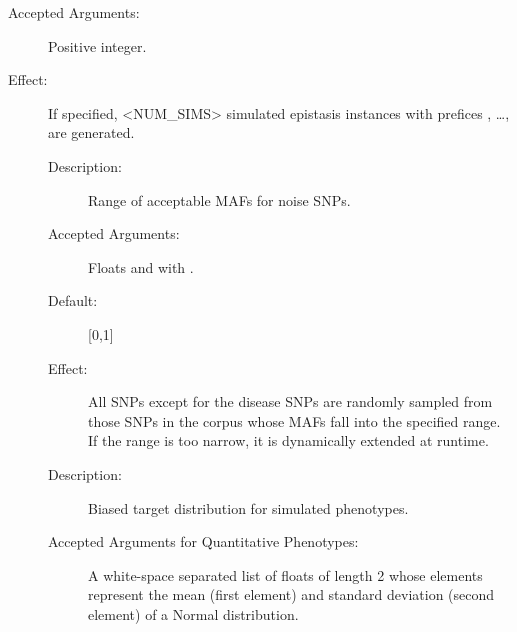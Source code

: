 \documentclass[a4paper,10pt,english]{sphinxhowto}
\begin{document}
\begin{description}
\begin{description}
\begin{description}
\item[{Accepted Arguments:}] \leavevmode
Positive integer.

\item[{Effect:}] \leavevmode
If specified, \textless{}NUM\_SIMS\textgreater{} simulated epistasis instances with prefices
, …,  are generated.

\end{description}

\end{description}

\item[{\sphinxstylestrong{Optional Arguments:}}] \leavevmode\begin{description}
\item[{}] \leavevmode\begin{description}
\item[{Description:}] \leavevmode
Range of acceptable MAFs for noise SNPs.

\item[{Accepted Arguments:}] \leavevmode
Floats  and  with .

\item[{Default:}] \leavevmode
{[}0,1{]}

\item[{Effect:}] \leavevmode
All SNPs except for the disease SNPs are randomly sampled from those SNPs in the corpus whose MAFs
fall into the specified range. If the range is too narrow, it is dynamically extended at runtime.

\end{description}

\item[{}] \leavevmode\begin{description}
\item[{Description:}] \leavevmode
Biased target distribution for simulated phenotypes.

\item[{Accepted Arguments for Quantitative Phenotypes:}] \leavevmode
A white-space separated list of floats of length 2 whose elements represent the mean (first element) and
standard deviation (second element) of a Normal distribution.


\end{description}
\end{description}
\end{description}
\end{document}
